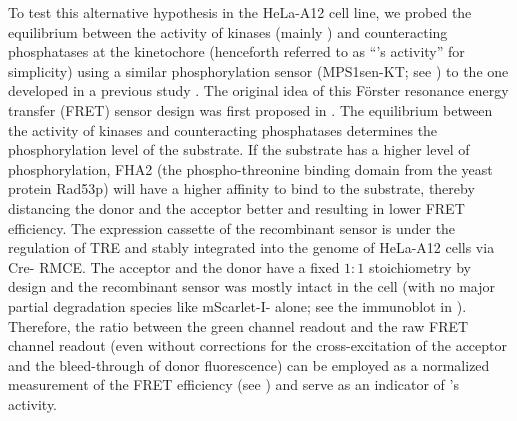 To test this alternative hypothesis in the HeLa-A12 cell line, we probed the equilibrium between the activity of kinases (mainly ) and counteracting phosphatases at the kinetochore (henceforth referred to as ``'s activity'' for simplicity) using a similar phosphorylation sensor (MPS1sen-KT; see ) to the one developed in a previous study \cite{MPS1senor}. The original idea of this F{\"{o}}rster resonance energy transfer (FRET) sensor design was first proposed in \cite{FHA2BasedFRETSensorOriginalStudy}. The equilibrium between the activity of kinases and counteracting phosphatases determines the phosphorylation level of the substrate. If the substrate has a higher level of phosphorylation, FHA2 (the phospho-threonine binding domain from the yeast protein Rad53p) will have a higher affinity to bind to the substrate, thereby distancing the donor and the acceptor better and resulting in lower FRET efficiency. The expression cassette of the recombinant sensor is under the regulation of TRE and stably integrated into the genome of HeLa-A12 cells via Cre- RMCE. The acceptor and the donor have a fixed $1 : 1$ stoichiometry by design and the recombinant sensor was mostly intact in the cell (with no major partial degradation species like mScarlet-I- alone; see the immunoblot in ). Therefore, the ratio between the green channel readout and the raw FRET channel readout (even without corrections for the cross-excitation of the acceptor and the bleed-through of donor fluorescence) can be employed as a normalized measurement of the FRET efficiency (see ) and serve as an indicator of 's activity.

